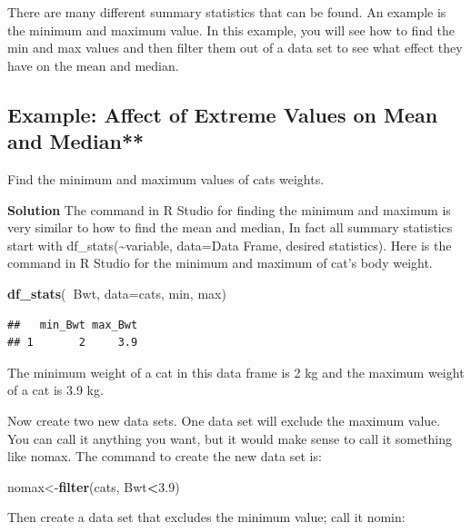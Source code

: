 \documentclass[]{book}
\newenvironment{Shaded}{\begin{snugshade}}{\end{snugshade}}
\newcommand{\DataTypeTok}[1]{\textcolor[rgb]{0.13,0.29,0.53}{#1}}
\newcommand{\FloatTok}[1]{\textcolor[rgb]{0.00,0.00,0.81}{#1}}
\newcommand{\KeywordTok}[1]{\textcolor[rgb]{0.13,0.29,0.53}{\textbf{#1}}}
\newcommand{\NormalTok}[1]{#1}
\newcommand{\OperatorTok}[1]{\textcolor[rgb]{0.81,0.36,0.00}{\textbf{#1}}}
\begin{document}
There are many different summary statistics that can be found. An example is the minimum and maximum value. In this example, you will see how to find the min and max values and then filter them out of a data set to see what effect they have on the mean and median.

\hypertarget{example-affect-of-extreme-values-on-mean-and-median}{%
\subsection{Example: Affect of Extreme Values on Mean and Median**}\label{example-affect-of-extreme-values-on-mean-and-median}}

Find the minimum and maximum values of cats weights.

\textbf{Solution}
The command in R Studio for finding the minimum and maximum is very similar to how to find the mean and median, In fact all summary statistics start with df\_stats(\textasciitilde{}variable, data=Data Frame, desired statistics). Here is the command in R Studio for the minimum and maximum of cat's body weight.

\begin{Shaded}
\begin{Highlighting}[]
\KeywordTok{df_stats}\NormalTok{(}\OperatorTok{~}\NormalTok{Bwt, }\DataTypeTok{data=}\NormalTok{cats, min, max)}
\end{Highlighting}
\end{Shaded}

\begin{verbatim}
##   min_Bwt max_Bwt
## 1       2     3.9
\end{verbatim}

The minimum weight of a cat in this data frame is 2 kg and the maximum weight of a cat is 3.9 kg.

Now create two new data sets. One data set will exclude the maximum value. You can call it anything you want, but it would make sense to call it something like nomax. The command to create the new data set is:

\begin{Shaded}
\begin{Highlighting}[]
\NormalTok{nomax<-}\KeywordTok{filter}\NormalTok{(cats, Bwt}\OperatorTok{<}\FloatTok{3.9}\NormalTok{)}
\end{Highlighting}
\end{Shaded}

Then create a data set that excludes the minimum value; call it nomin:
\end{document}
